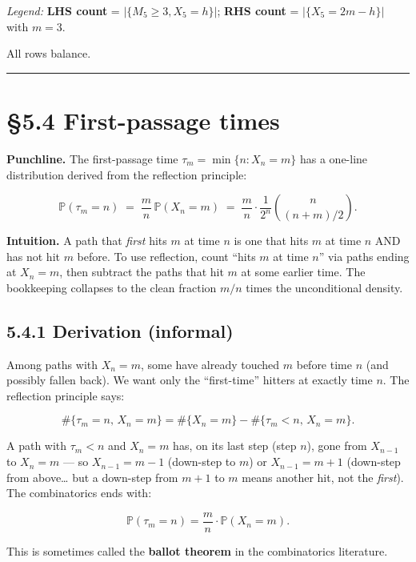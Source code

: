 \documentclass[
  10pt,
  twoside]{book}
\begin{document}
\emph{Legend:} \textbf{LHS count} =
\(\lvert\{M_5 \ge 3, X_5 = h\}\rvert\); \textbf{RHS count} =
\(\lvert\{X_5 = 2m - h\}\rvert\) with \(m = 3\).

All rows balance.

\begin{center}\rule{0.5\linewidth}{0.5pt}\end{center}

\section{§5.4 First-passage times}\label{first-passage-times}

\textbf{Punchline.} The first-passage time
\(\tau_m = \min\{n : X_n = m\}\) has a one-line distribution derived
from the reflection principle:

\[\boxed{\;\mathbb P(\tau_m = n) \;=\; \frac{m}{n}\,\mathbb P(X_n = m) \;=\; \frac{m}{n}\cdot\frac{1}{2^n}\binom{n}{(n+m)/2}.\;}\]

\textbf{Intuition.} A path that \emph{first} hits \(m\) at time \(n\) is
one that hits \(m\) at time \(n\) AND has not hit \(m\) before. To use
reflection, count ``hits \(m\) at time \(n\)'' via paths ending at
\(X_n = m\), then subtract the paths that hit \(m\) at some earlier
time. The bookkeeping collapses to the clean fraction \(m/n\) times the
unconditional density.

\subsection{5.4.1 Derivation (informal)}\label{derivation-informal}

Among paths with \(X_n = m\), some have already touched \(m\) before
time \(n\) (and possibly fallen back). We want only the ``first-time''
hitters at exactly time \(n\). The reflection principle says:

\[\#\{\tau_m = n,\, X_n = m\} = \#\{X_n = m\} - \#\{\tau_m < n,\, X_n = m\}.\]

A path with \(\tau_m < n\) and \(X_n = m\) has, on its last step (step
\(n\)), gone from \(X_{n-1}\) to \(X_n = m\) --- so \(X_{n-1} = m - 1\)
(down-step to \(m\)) or \(X_{n-1} = m + 1\) (down-step from
above\ldots{} but a down-step from \(m+1\) to \(m\) means another hit,
not the \emph{first}). The combinatorics ends with:

\[\mathbb P(\tau_m = n) = \frac{m}{n} \cdot \mathbb P(X_n = m).\]

This is sometimes called the \textbf{ballot theorem} in the
combinatorics literature.
\end{document}

